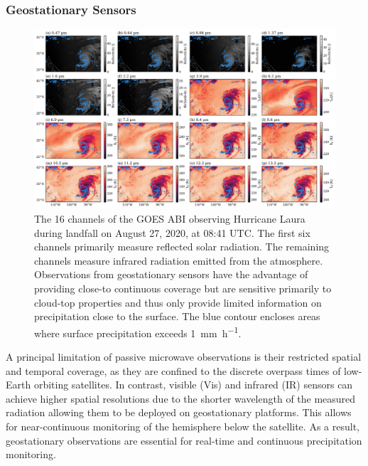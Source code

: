 \documentclass[11pt]{article}
\begin{document}
\subsubsection{Geostationary Sensors}

\begin{figure}[htbp] %
	\centering
	\includegraphics[width=1.0\textwidth]{figures/fig03}
	\caption{
		The 16 channels of the GOES ABI observing Hurricane Laura during
		landfall on August 27, 2020, at 08:41 UTC. The first six channels
		primarily measure reflected solar radiation. The remaining channels
		measure infrared radiation emitted from the atmosphere. Observations
		from geostationary sensors have the advantage of providing close-to
		continuous coverage but are sensitive primarily to cloud-top properties
		and thus only provide limited information on precipitation close to the
		surface. The blue contour encloses areas where surface precipitation
		exceeds \SI{1}{\milli \meter \per \hour}.
	}
	\label{fig:observations_geo}
\end{figure}


A principal limitation of passive microwave observations is their restricted
spatial and temporal coverage, as they are confined to the discrete overpass
times of low-Earth orbiting satellites. In contrast, visible (Vis) and infrared
(IR) sensors can achieve higher spatial resolutions due to the shorter
wavelength of the measured radiation allowing them to be deployed on
geostationary platforms. This allows for near-continuous monitoring of the
hemisphere below the satellite. As a result, geostationary observations are
essential for real-time and continuous precipitation monitoring.
\end{document}
